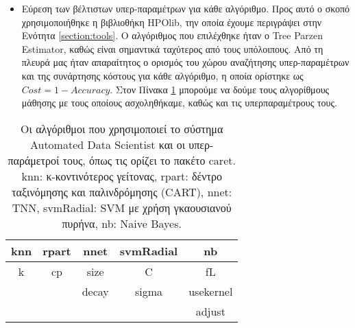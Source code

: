 \begin{itemize}
\begin{table}[!htb]
\begin{center}
\begin{tabular}{ |c| }
	 			\hline
	 		\end{tabular}    
	 	\end{center}
	 \end{table}
	\item Εύρεση των βέλτιστων υπερ-παραμέτρων για κάθε αλγόριθμο. Προς αυτό ο σκοπό χρησιμοποιήθηκε η βιβλιοθήκη HPOlib, την οποία έχουμε περιγράψει στην Eνότητα \ref{section:tools}. Ο αλγόριθμος που επιλέχθηκε ήταν ο Tree Parzen Estimator, καθώς είναι σημαντικά ταχύτερος από τους υπόλοιπους. Από τη πλευρά μας ήταν απαραίτητος ο ορισμός του χώρου αναζήτησης υπερ-παραμέτρων και της συνάρτησης κόστους για κάθε αλγόριθμο, η οποία ορίστηκε ως $ Cost = 1- Accuracy$. Στον Πίνακα \ref{table:algorithms} μπορούμε να δούμε τους αλγορίθμους μάθησης με τους οποίους ασχοληθήκαμε, καθώς και τις υπερπαραμέτρους τους.

\end{itemize}
	\begin{table}[!htb]
		\begin{center}
				\caption[Οι αλγόριθμοι που χρησιμοποιεί το σύστημα Automated Data Scientist και οι υπερ-παράμετροί του]{Οι αλγόριθμοι που χρησιμοποιεί το σύστημα Automated Data Scientist και οι υπερ-παράμετροί τους, όπως τις ορίζει το πακέτο caret. knn: κ-κοντινότερος γείτονας, rpart: δέντρο ταξινόμησης και παλινδρόμησης (CART), nnet: \gls{ΤΝΝ}, svmRadial: \gls{SVM} με χρήση γκαουσιανού πυρήνα, nb: Naive Bayes.} \label{table:meta}
			\begin{tabular}{ |c|c|c|c|c| } 
				\hline
				knn & rpart & nnet & svmRadial & nb\\
				\hline
			    k & cp & size& C & fL\\
			     &  & decay& sigma & usekernel \\
			     &  &    & & adjust \\
				\hline
			\end{tabular}    
		\end{center}
		\label{table:algorithms}
	\end{table} 
	
